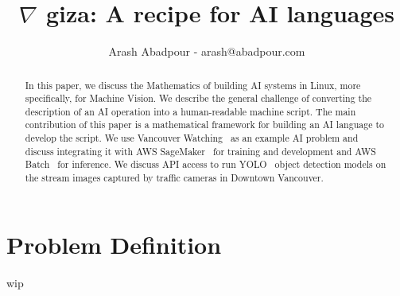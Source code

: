 \documentclass{article}
\title{$\nabla$ giza: A recipe for AI languages}
\author{Arash Abadpour - arash@abadpour.com}
\begin{document}
\maketitle

\begin{abstract}
In this paper, we discuss the Mathematics of building AI systems in Linux, more specifically, for Machine Vision. We describe the general challenge of converting the description of an AI operation into a human-readable machine script. The main contribution of this paper is a mathematical framework for building an AI language to develop the script. We use Vancouver Watching~\cite{vanwatch} as an example AI problem and discuss integrating it with AWS SageMaker~\cite{aws_sage_maker} for training and development and AWS Batch~\cite{aws_batch} for inference. We discuss API access to run YOLO~\cite{} object detection models on the stream images captured by traffic cameras in Downtown Vancouver. 
\end{abstract}

\section{Problem Definition}

wip



\end{document}
